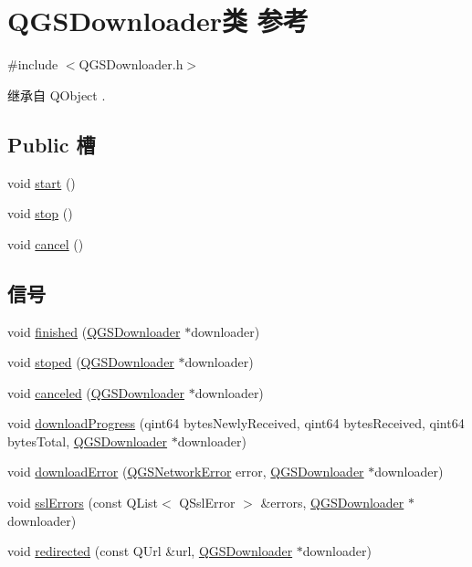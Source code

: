 \hypertarget{class_q_g_s_downloader}{}\section{Q\+G\+S\+Downloader类 参考}
\label{class_q_g_s_downloader}


{\ttfamily \#include $<$Q\+G\+S\+Downloader.\+h$>$}



继承自 Q\+Object .

\subsection*{Public 槽}
\begin{DoxyCompactItemize}
\item 
void \mbox{\hyperlink{class_q_g_s_downloader_a6f16693d52924ab54712c16372da77eb}{start}} ()
\item 
void \mbox{\hyperlink{class_q_g_s_downloader_af5b0de5b091826b2b950537aefbe160f}{stop}} ()
\item 
void \mbox{\hyperlink{class_q_g_s_downloader_a3679be0467ff9929fdd92b96322d6058}{cancel}} ()
\end{DoxyCompactItemize}
\subsection*{信号}
\begin{DoxyCompactItemize}
\item 
void \mbox{\hyperlink{class_q_g_s_downloader_af9bde826ed2de6cee5bc0343fa77168a}{finished}} (\mbox{\hyperlink{class_q_g_s_downloader}{Q\+G\+S\+Downloader}} $\ast$downloader)
\item 
void \mbox{\hyperlink{class_q_g_s_downloader_ae8d2dc514cfbba8a039ef7703b2c1c4a}{stoped}} (\mbox{\hyperlink{class_q_g_s_downloader}{Q\+G\+S\+Downloader}} $\ast$downloader)
\item 
void \mbox{\hyperlink{class_q_g_s_downloader_ae45b33f63a72ad89fd8fd026c38750f6}{canceled}} (\mbox{\hyperlink{class_q_g_s_downloader}{Q\+G\+S\+Downloader}} $\ast$downloader)
\item 
void \mbox{\hyperlink{class_q_g_s_downloader_a4ffa6614b2b7d2d0edfcfdc6e68d058a}{download\+Progress}} (qint64 bytes\+Newly\+Received, qint64 bytes\+Received, qint64 bytes\+Total, \mbox{\hyperlink{class_q_g_s_downloader}{Q\+G\+S\+Downloader}} $\ast$downloader)
\item 
void \mbox{\hyperlink{class_q_g_s_downloader_a10e903efc5fc57e577351cc3181663f0}{download\+Error}} (\mbox{\hyperlink{class_q_g_s_network_error}{Q\+G\+S\+Network\+Error}} error, \mbox{\hyperlink{class_q_g_s_downloader}{Q\+G\+S\+Downloader}} $\ast$downloader)
\item 
void \mbox{\hyperlink{class_q_g_s_downloader_a7de93269dac563bbded37f81bec00318}{ssl\+Errors}} (const Q\+List$<$ Q\+Ssl\+Error $>$ \&errors, \mbox{\hyperlink{class_q_g_s_downloader}{Q\+G\+S\+Downloader}} $\ast$downloader)
\item 
void \mbox{\hyperlink{class_q_g_s_downloader_a4d578882f640c4975c2200d2eb8d5bfa}{redirected}} (const Q\+Url \&url, \mbox{\hyperlink{class_q_g_s_downloader}{Q\+G\+S\+Downloader}} $\ast$downloader)
\end{DoxyCompactItemize}
